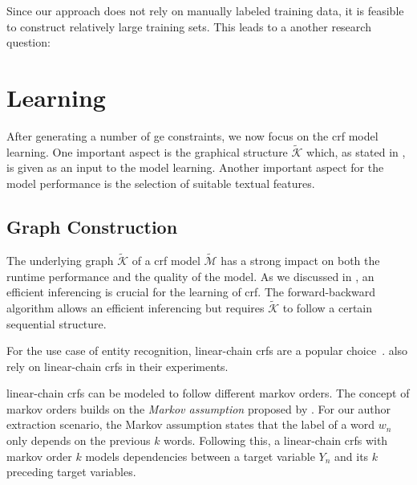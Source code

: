 \bigskip

Since our approach does not rely on manually labeled training data, it is feasible to construct relatively large training sets.
This leads to a another research question:
\newcommand\researchquestionsix{}
\researchquestionsix%




\section{Learning }\label{sec:ae-learning-crfs}

After generating a number of \gls{ge} constraints, we now focus on the \gls{crf} model learning.
One important aspect is the graphical structure $\mathcal{\tilde{K}}$ which, as stated in , is given as an input to the model learning.
Another important aspect for the model performance is the selection of suitable textual features.

\subsection{Graph Construction}\label{subsec:ae-graph-construction}

The underlying graph $\mathcal{\tilde{K}}$ of a \gls{crf} model $\mathcal{\tilde{M}}$ has a strong impact on both the runtime performance and the quality of the model.
As we discussed in , an efficient inferencing is crucial for the learning of \gls{crf}.
The \gls{forward-backward algorithm} allows an efficient inferencing but requires $\mathcal{\tilde{K}}$ to follow a certain sequential structure.

For the use case of entity recognition, \glspl{linear-chain crf} are a popular choice~\citep[e.g.][]{peng2004accurate,mann2008generalized,ling2012fine,groza2012reference,ohta2014empirical}.
\citet{lu2013web} also rely on \glspl{linear-chain crf} in their experiments.

\Glspl{linear-chain crf} can be modeled to follow different \glspl{markov order}.
The concept of \glspl{markov order} builds on the \textit{Markov assumption} proposed by \citet{markov1957theory}.
For our author extraction scenario, the Markov assumption states that the label of a word $w_n$ only depends on the previous $k$ words.
Following this, a \glspl{linear-chain crf} with \gls{markov order} $k$ models dependencies between a \gls{target variable} $Y_n$ and its $k$ preceding \glspl{target variable}.


